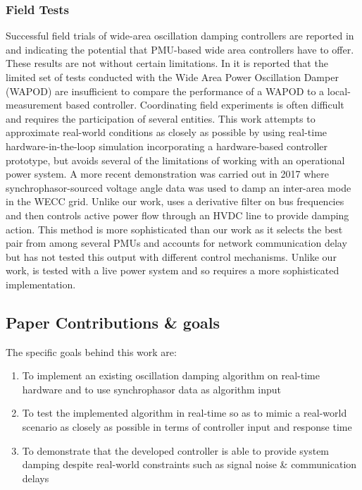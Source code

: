 \documentclass{ieeeaccess}
\begin{document}
\subsubsection{Field Tests}
Successful field trials of wide-area oscillation damping controllers are reported in \cite{WAPODNorway} and \cite{WAPODChina} indicating the potential that PMU-based wide area controllers have to offer. These results are not without certain limitations. In \cite{WAPODNorway} it is reported that the limited set of tests conducted with the Wide Area Power Oscillation Damper (WAPOD) are insufficient to compare the performance of a WAPOD to a local-measurement based controller. Coordinating field experiments is often difficult and requires the participation of several entities. This work attempts to approximate real-world conditions as closely as possible by using real-time hardware-in-the-loop simulation incorporating a hardware-based controller prototype, but avoids several of the limitations of working with an operational power system. A more recent demonstration was carried out in 2017 \cite{Schoenwald_WECC_test} where synchrophasor-sourced voltage angle data was used to damp an inter-area mode in the WECC grid. Unlike our work, \cite{Schoenwald_WECC_test} uses a derivative filter on bus frequencies and then controls active power flow through an HVDC line to provide damping action. This method is more sophisticated than our work as it selects the best pair from among several PMUs and accounts for network communication delay but has not tested this output with different control mechanisms. Unlike our work,  \cite{Schoenwald_WECC_test} is tested with a live power system and so requires a more sophisticated implementation.


\subsection{Paper Contributions \& goals}

The specific goals behind this work are:
\begin{enumerate}
\item To implement an existing oscillation damping algorithm on real-time hardware and to use synchrophasor data as algorithm input
\item To test the implemented algorithm in real-time so as to mimic a real-world scenario as closely as possible in terms of controller input and response time
\item To demonstrate that the developed controller is able to provide system damping despite real-world constraints such as signal noise \& communication delays
\end{enumerate}
\end{document}

